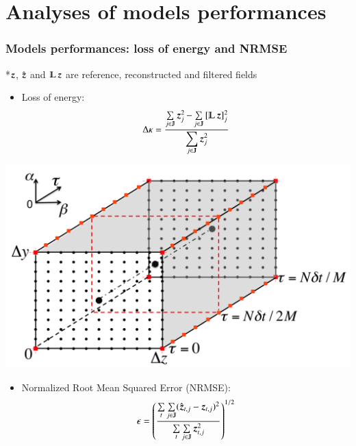 \documentclass{beamer}
\let\olditem\item
\renewcommand{\item}{\setlength{\itemsep}{\fill}\olditem}
\begin{document}
\section[Models performances]{Analyses of models performances}
\begin{frame}
\frametitle{Models performances: loss of energy and NRMSE}
	*$ \operatorname{\boldsymbol{z}} $, $ \hat{\operatorname{\boldsymbol{z}}} $ and $ \LPF \z $ are reference, reconstructed and filtered fields

	\begin{minipage}{\textwidth}
		\begin{minipage}{0.5\textwidth}
			\begin{itemize}
			\item Loss of energy:
			\begin{equation*}
				\Delta\kappa=\frac{\sum\limits_{j\in \varmathbb{J}} \z _j^2-\sum\limits_{j\in \varmathbb{J}}{[\LPF\z ]_j^2}}{\displaystyle \sum\limits_{j\in \varmathbb{J}}\z _j^2}
			\end{equation*} 
			\end{itemize}
		\end{minipage}		
		\begin{minipage}{0.5\textwidth}
			\includegraphics[width=\columnwidth]{./figures/experimentalsetup/element_block.png}
		\end{minipage}		
	\end{minipage}
	\begin{itemize}	
		\item Normalized Root Mean Squared Error (NRMSE):
		\begin{equation*}
		\epsilon = \left(\frac{ \sum\limits_{t} \sum\limits_{j\in \varmathbb{J}}(\hat{\mybold{z}}_{t,j}-\mybold{z}_{t,j})^2}{\sum\limits_{t} \sum\limits_{j\in \varmathbb{J}}\mybold{z}_{t,j}^2}\right)^{1/2}
		\end{equation*} 
	\end{itemize}		
\end{frame}
\end{document}
